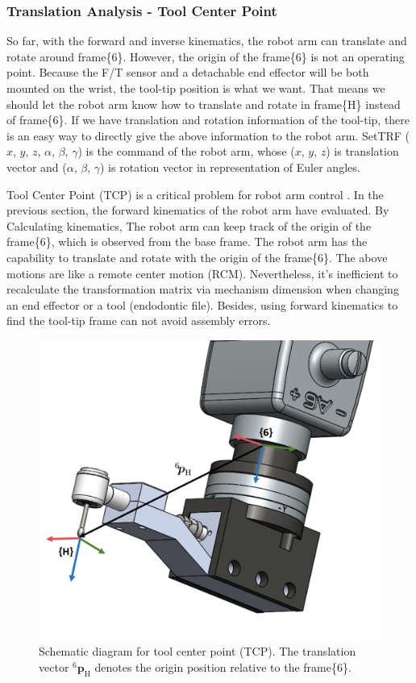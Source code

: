 \subsubsection{Translation Analysis - Tool Center Point}
\label{sec:tcp}
\hspace*{6mm}So far, with the forward and inverse kinematics, the robot arm can translate and rotate around frame\{6\}. However, the origin of the frame\{6\} is not an operating point. Because the F/T sensor and a detachable end effector will be both mounted on the wrist, the tool-tip position is what we want. That means we should let the robot arm know how to translate and rotate in frame\{H\} instead of frame\{6\}. If we have translation and rotation information of the tool-tip, there is an easy way to directly give the above information to the robot arm. SetTRF ($x$, $y$, $z$, $\alpha$, $\beta$, $\gamma$) is the command of the robot arm, whose ($x$, $y$, $z$) is translation vector and ($\alpha$, $\beta$, $\gamma$) is rotation vector in representation of Euler angles.
\par
Tool Center Point (TCP) is a critical problem for robot arm control \cite{yang2017four}. In the previous section, the forward kinematics of the robot arm have evaluated. By Calculating kinematics, The robot arm can keep track of the origin of the frame\{6\}, which is observed from the base frame. The robot arm has the capability to translate and rotate with the origin of the frame\{6\}. The above motions are like a remote center motion (RCM).  Nevertheless, it's inefficient to recalculate the transformation matrix via mechanism dimension when changing an end effector or a tool (endodontic file). Besides, using forward kinematics to find the tool-tip frame can not avoid assembly errors.
\begin{figure}[htbp]
\begin{center}
\includegraphics[width=0.7\linewidth]{Images/TCP.png}
\caption{
Schematic diagram for tool center point (TCP). The translation vector $^\mathrm{6}\!\boldsymbol{p}_\mathrm{H}$ denotes the origin position relative to the frame\{6\}.
}\label{fig:tcp}
\end{center}
\end{figure}
